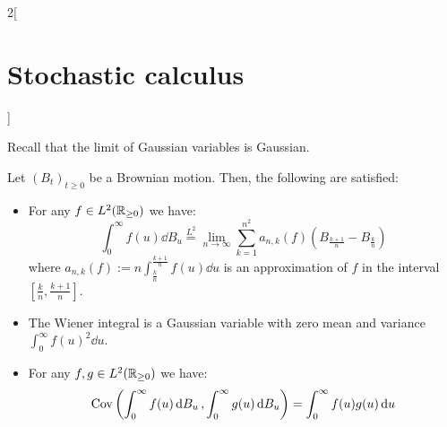 \documentclass[../../../main_math.tex]{subfiles}
\begin{document}
\begin{multicols}{2}[\section{Stochastic calculus}]
\begin{remark}
    Recall that the limit of Gaussian variables is Gaussian.
  \end{remark}
  \begin{proposition}
    Let ${(B_t)}_{t\geq 0}$ be a Brownian motion. Then, the following are satisfied:
    \begin{itemize}
      \item For any $f\in L^2(\mathbb{R}_{\geq 0})$ we have:
            $$
              \int_0^\infty f(u)\dd{B_u}\overset{L^2}{=}\lim_{n\to\infty}\sum_{k=1}^{n^2}a_{n,k}(f)(B_{\frac{k+1}{n}}-B_{\frac{k}{n}})
            $$
            where $a_{n,k}(f):=n\int_{\frac{k}{n}}^{\frac{k+1}{n}}f(u)\dd{u}$ is an approximation of $f$ in the interval $[\frac{k}{n},\frac{k+1}{n}]$.
      \item The Wiener integral is a Gaussian variable with zero mean and variance $\int_0^\infty{f(u)}^2\dd{u}$.
      \item For any $f,g\in L^2(\mathbb{R}_{\geq 0})$ we have:
            $$
              \mathrm{Cov}\left(\int_0^\infty f(u)\dd{B_u},\int_0^\infty g(u)\dd{B_u}\right)=\int_0^\infty f(u)g(u)\dd{u}
            $$
    \end{itemize}
  \end{proposition}

\end{multicols}
\end{document}
